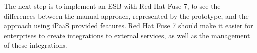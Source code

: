 The next step is to implement an ESB with Red Hat Fuse 7, to see the differences between the manual approach, represented by the prototype, and the approach using iPaaS provided features. Red Hat Fuse 7 should make it easier for enterprises to create integrations to external services, as well as the management of these integrations.   